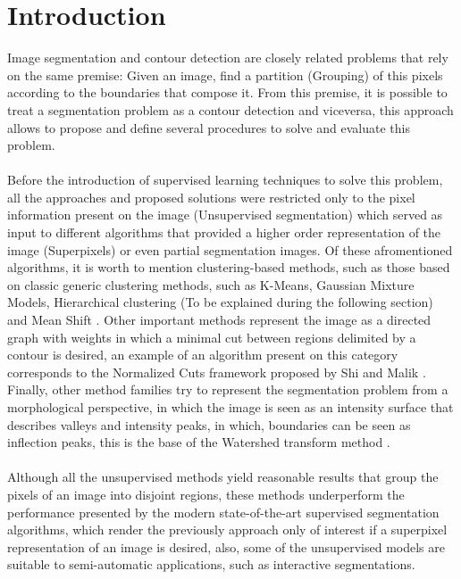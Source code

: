 \documentclass[10pt,twocolumn,letterpaper]{article}
\begin{document}
\section{Introduction}
Image segmentation and contour detection are closely related problems that rely on the same premise: Given an image, find a partition (Grouping) of this pixels according to the boundaries that compose it. From this premise, it is possible to treat a segmentation problem as a contour detection and viceversa, this approach allows to propose and define several procedures to solve and evaluate this problem. 
\\
\\
Before the introduction of supervised learning techniques to solve this problem, all the approaches and proposed solutions were restricted only to the pixel information present on the image (Unsupervised segmentation) which served as input to different algorithms that provided a higher order representation of the image (Superpixels) or even partial segmentation images. Of these afromentioned algorithms, it is worth to mention clustering-based methods, such as those based on classic generic clustering methods, such as K-Means, Gaussian Mixture Models, Hierarchical clustering (To be explained during the following section) and Mean Shift \cite{1000236}. Other important methods represent the image as a directed graph with weights in which a minimal cut between regions delimited by a contour is desired, an example of an algorithm present on this category corresponds to the Normalized Cuts framework proposed by Shi and Malik \cite{868688}. Finally, other method families try to represent the segmentation problem from a morphological perspective, in which the image is seen as an intensity surface that describes valleys and intensity peaks, in which, boundaries can be seen as inflection peaks, this is the base of the Watershed transform method \cite{Beucher1994}.
\\
\\
Although all the unsupervised methods yield reasonable results that group the pixels of an image into disjoint regions, these methods underperform the performance presented by the modern state-of-the-art supervised segmentation algorithms, which render the previously approach only of interest if a superpixel representation of an image is desired, also, some of the unsupervised models are suitable to semi-automatic applications, such as interactive segmentations.
\end{document}

